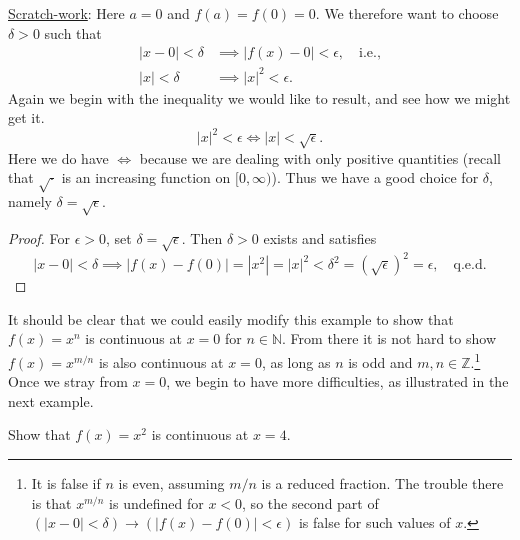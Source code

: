 \qquad\underline{Scratch-work}: Here $a=0$ and $f(a)=f(0)=0$.
We therefore want to choose $\delta>0$ such that
\begin{align*}|x-0|<\delta&\implies|f(x)-0|<\epsilon, \quad\text{i.e.,}\\
|x|<\delta&\implies |x|^2<\epsilon.\end{align*}
Again we begin with the inequality we would like to result, and see
how we might get it.
$$|x|^2<\epsilon\iff|x|<\sqrt{\epsilon}.$$
Here we do have $\iff$ because we are dealing with only positive 
quantities (recall that $\sqrt\cdot$ is an increasing function
on $[0,\infty)$).
Thus we have a good choice for $\delta$, namely $\delta=\sqrt{\epsilon}$.

\begin{proof}
For $\epsilon>0$, set $\delta=\sqrt\epsilon$.  Then $\delta>0$ exists
and satisfies
$$|x-0|<\delta\implies
|f(x)-f(0)|=|x^2|=|x|^2<\delta^2=\left(\sqrt{\epsilon}\right)^2=\epsilon,
\quad\text{q.e.d.}$$
\end{proof}\label{x^2contat0}\eex
It should be clear that we could easily modify this example to show
that $f(x)=x^n$ is continuous at $x=0$ for
$n\in \mathbb{N}$.  From there it is not hard to show
$f(x)=x^{m/n}$ is also continuous at $x=0$, as long as $n$ is odd
and $m,n\in\mathbb{Z}$.\footnote{%
It is false if $n$ is even, assuming $m/n$ is a reduced fraction.
The trouble there is that $x^{m/n}$ is undefined for $x<0$, so the
second part of $(|x-0|<\delta)\longrightarrow(|f(x)-f(0)|<\epsilon)$
is false for such values of $x$.%
} %
Once we 
stray from $x=0$, we begin to have more difficulties, as
illustrated in the next example. 






\bex Show that $f(x)=x^2$ is continuous at $x=4$.

